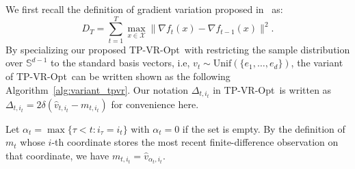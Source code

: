 \documentclass[journal,onecolumn]{IEEEtran}
\newcommand{\cX}{\mathcal{X}}
\theoremstyle{plain}
\theoremstyle{definition}
\theoremstyle{remark}
\newcommand{\tpvr}{{\sc TP-VR-Opt}}
\begin{document}
{We first recall the definition of gradient variation proposed in~\cite{chiang2013beating} as:
\begin{equation*}
    D_T=\sum_{t=1}^T \max_{x\in\cX}\|\nabla f_t(x)-\nabla f_{t-1}(x)\|^2.
\end{equation*}
By specializing our proposed \tpvr\, with restricting the sample distribution over $\mathbb{S}^{d-1}$ to the standard basis vectors, i.e, $v_t\sim \mathrm{Unif}(\{e_1,\dotsc,e_d\})$, the variant of \tpvr\, can be written shown as the following Algorithm~\ref{alg:variant_tpvr}. Our notation $\Delta_{t,i_t}$ in \tpvr\, is written as $\Delta_{t,i_t}=2\delta(\widehat{v}_{t,i_t}-m_{t,i_t})$ for convenience here.

Let $\alpha_t=\max\{\tau<t: i_{\tau}=i_t\}$ with $\alpha_t=0$ if the set is empty. By the definition of $m_t$ whose $i$-th coordinate stores the most
recent finite-difference observation on that coordinate, we have $m_{t,i_t}=\widehat{v}_{\alpha_t,i_t}$.

}
\end{document}
